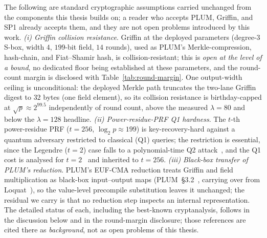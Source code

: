 \begin{assumption}\label{asm:inherited}
    The following are standard cryptographic assumptions carried unchanged from the components this thesis builds on; a reader who accepts PLUM, Griffin, and SP1 already accepts them, and they are not open problems introduced by this work. \emph{(i) Griffin collision resistance}. Griffin at the deployed parameters (degree-$3$ S-box, width $4$, $199$-bit field, $14$ rounds), used as PLUM's Merkle-compression, hash-chain, and Fiat--Shamir hash, is collision-resistant; this is \emph{open at the level of a bound}, no dedicated floor being established at these parameters, and the round-count margin is disclosed with Table~\ref{tab:round-margin}. One output-width ceiling is unconditional: the deployed Merkle path truncates the two-lane Griffin digest to $32$ bytes (one field element), so its collision resistance is birthday-capped at $\sqrt p\approx2^{99.5}$ independently of round count, above the measured $\lambda=80$ and below the $\lambda=128$ headline. \emph{(ii) Power-residue-PRF Q1 hardness}. The $t$-th power-residue PRF ($t=256$, $\log_2 p\approx199$) is key-recovery-hard against a quantum adversary restricted to classical (Q1) queries; the restriction is essential, since the Legendre ($t{=}2$) case falls to a polynomial-time Q2 attack~\cite{vandamhallgrenip2006}, and the Q1 cost is analysed for $t{=}2$~\cite{frixons2021quantum} and inherited to $t=256$. \emph{(iii) Black-box transfer of PLUM's reduction}. PLUM's EUF-CMA reduction treats Griffin and field multiplication as black-box input--output maps (PLUM~\S3.2~\cite{10.1007/978-981-95-2961-2_6}, carrying over from Loquat~\cite{cryptoeprint:2024/868}), so the value-level precompile substitution leaves it unchanged; the residual we carry is that no reduction step inspects an internal representation. The detailed status of each, including the best-known cryptanalysis, follows in the discussion below and in the round-margin disclosure; those references are cited there as \emph{background}, not as open problems of this thesis.
\end{assumption}

